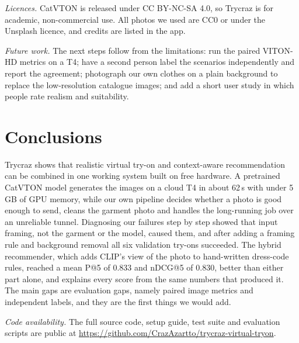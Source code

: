 \documentclass{article}
\begin{document}
\emph{Licences.} CatVTON is released under CC BY-NC-SA 4.0, so Trycraz is for academic,
non-commercial use. All photos we used are CC0 or under the Unsplash licence, and credits are listed in
the app.

\emph{Future work.} The next steps follow from the limitations: run the paired VITON-HD metrics on a
T4; have a second person label the scenarios independently and report the agreement; photograph our
own clothes on a plain background to replace the low-resolution catalogue images; and add a short
user study in which people rate realism and suitability.


\section{Conclusions}
\label{sec:concl}

Trycraz shows that realistic virtual try-on and context-aware recommendation can be combined in one
working system built on free hardware. A pretrained CatVTON model generates the images on a cloud T4 in
about 62\,s with under 5\,GB of GPU memory, while our own pipeline decides whether a photo is good
enough to send, cleans the garment photo and handles the long-running job over an unreliable tunnel.
Diagnosing our failures step by step showed that input framing, not the garment or the model, caused
them, and after adding a framing rule and background removal all six validation try-ons succeeded. The
hybrid recommender, which adds CLIP's view of the photo to hand-written dress-code rules, reached a mean
P@5 of 0.833 and nDCG@5 of 0.830, better than either part alone, and explains every score from the same
numbers that produced it. The main gaps are evaluation gaps, namely paired image metrics and independent
labels, and they are the first things we would add.

\emph{Code availability.} The full source code, setup guide, test suite and evaluation scripts are
public at \url{https://github.com/CrazAzartto/trycraz-virtual-tryon}.
\end{document}
